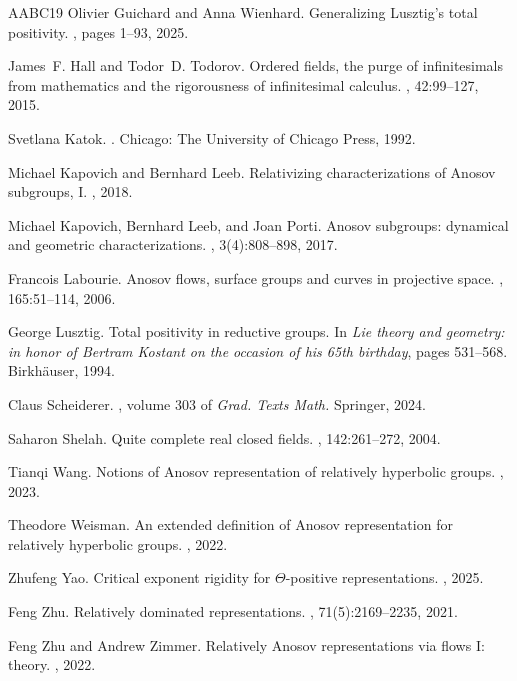 \documentclass{amsart}
\theoremstyle{plain}
\theoremstyle{definition}
\newcommand{\1}{\mathbf{1}}
\begin{document}
\begin{thebibliography}{AABC{\etalchar{+}}19}
Olivier Guichard and Anna Wienhard.
\newblock Generalizing {L}usztig’s total positivity.
, pages 1--93, 2025.

James~F. Hall and Todor~D. Todorov.
\newblock Ordered fields, the purge of infinitesimals from mathematics and the
  rigorousness of infinitesimal calculus.
, 42:99--127, 2015.

Svetlana Katok.
.
\newblock Chicago: The University of Chicago Press, 1992.

Michael Kapovich and Bernhard Leeb.
\newblock Relativizing characterizations of {A}nosov subgroups, {I}.
, 2018.

Michael Kapovich, Bernhard Leeb, and Joan Porti.
\newblock Anosov subgroups: dynamical and geometric characterizations.
, 3(4):808--898, 2017.

Francois Labourie.
\newblock Anosov flows, surface groups and curves in projective space.
, 165:51--114, 2006.

George Lusztig.
\newblock Total positivity in reductive groups.
\newblock In {\em Lie theory and geometry: in honor of Bertram Kostant on the
  occasion of his 65th birthday}, pages 531--568. Birkh{\"a}user, 1994.

Claus Scheiderer.
, volume 303 of {\em Grad. Texts Math.}
\newblock Springer, 2024.

Saharon Shelah.
\newblock Quite complete real closed fields.
, 142:261--272, 2004.

Tianqi Wang.
\newblock Notions of {A}nosov representation of relatively hyperbolic groups.
, 2023.

Theodore Weisman.
\newblock An extended definition of {A}nosov representation for relatively
  hyperbolic groups.
, 2022.

Zhufeng Yao.
\newblock Critical exponent rigidity for {$\Theta$}-positive representations.
, 2025.

Feng Zhu.
\newblock Relatively dominated representations.
, 71(5):2169--2235, 2021.

Feng Zhu and Andrew Zimmer.
\newblock Relatively {A}nosov representations via flows {I}: theory.
, 2022.

\end{thebibliography}
\end{document}

